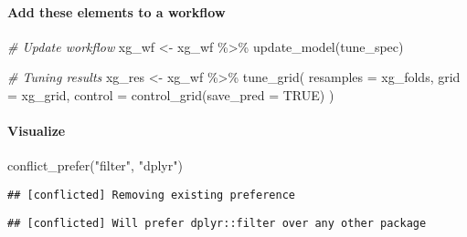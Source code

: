 \documentclass[
]{book}
\newenvironment{Shaded}{\begin{snugshade}}{\end{snugshade}}
\newcommand{\AttributeTok}[1]{\textcolor[rgb]{0.77,0.63,0.00}{#1}}
\newcommand{\CommentTok}[1]{\textcolor[rgb]{0.56,0.35,0.01}{\textit{#1}}}
\newcommand{\ConstantTok}[1]{\textcolor[rgb]{0.00,0.00,0.00}{#1}}
\newcommand{\FunctionTok}[1]{\textcolor[rgb]{0.00,0.00,0.00}{#1}}
\newcommand{\NormalTok}[1]{#1}
\newcommand{\OtherTok}[1]{\textcolor[rgb]{0.56,0.35,0.01}{#1}}
\newcommand{\SpecialCharTok}[1]{\textcolor[rgb]{0.00,0.00,0.00}{#1}}
\newcommand{\StringTok}[1]{\textcolor[rgb]{0.31,0.60,0.02}{#1}}
\begin{document}
\hypertarget{add-these-elements-to-a-workflow-3}{%
\paragraph{Add these elements to a workflow}\label{add-these-elements-to-a-workflow-3}}

\begin{Shaded}
\begin{Highlighting}[]
\CommentTok{\# Update workflow}
\NormalTok{xg\_wf }\OtherTok{\textless{}{-}}\NormalTok{ xg\_wf }\SpecialCharTok{\%\textgreater{}\%} \FunctionTok{update\_model}\NormalTok{(tune\_spec)}

\CommentTok{\# Tuning results}
\NormalTok{xg\_res }\OtherTok{\textless{}{-}}\NormalTok{ xg\_wf }\SpecialCharTok{\%\textgreater{}\%}
  \FunctionTok{tune\_grid}\NormalTok{(}
    \AttributeTok{resamples =}\NormalTok{ xg\_folds,}
    \AttributeTok{grid =}\NormalTok{ xg\_grid,}
    \AttributeTok{control =} \FunctionTok{control\_grid}\NormalTok{(}\AttributeTok{save\_pred =} \ConstantTok{TRUE}\NormalTok{)}
\NormalTok{  )}
\end{Highlighting}
\end{Shaded}

\hypertarget{visualize-3}{%
\paragraph{Visualize}\label{visualize-3}}

\begin{Shaded}
\begin{Highlighting}[]
\FunctionTok{conflict\_prefer}\NormalTok{(}\StringTok{"filter"}\NormalTok{, }\StringTok{"dplyr"}\NormalTok{)}
\end{Highlighting}
\end{Shaded}

\begin{verbatim}
## [conflicted] Removing existing preference
\end{verbatim}

\begin{verbatim}
## [conflicted] Will prefer dplyr::filter over any other package
\end{verbatim}
\end{document}
